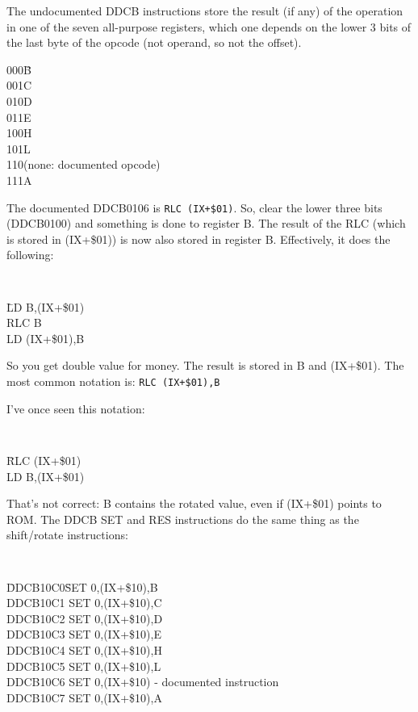 \documentclass[twoside,openright,a4paper]{book}
\begin{document}
The undocumented DDCB instructions store the result (if any) of the operation in one of the seven all-purpose registers, which one depends on the lower 3 bits of the last byte of the opcode (not operand, so not the offset).

\begin{tabbing}
	{\qquad}000\quad\=B\\
	{\qquad}001\>C\\
	{\qquad}010\>D\\
	{\qquad}011\>E\\
	{\qquad}100\>H\\
	{\qquad}101\>L\\
	{\qquad}110\>(none: documented opcode)\\
	{\qquad}111\>A
\end{tabbing}

The documented DDCB0106 is {\tt RLC (IX+\$01)}. So, clear the lower three bits (DDCB0100) and something is done to register B. The result of the RLC (which is stored in (IX+\$01)) is now also stored in register B. Effectively, it does the following:

{\tt 
	\begin{tabbing}
		{\qquad}\=LD B,(IX+\$01)\+\\
		RLC B\\
		LD (IX+\$01),B
	\end{tabbing}
}

So you get double value for money. The result is stored in B and (IX+\$01). The most common notation is: {\tt RLC (IX+\$01),B}

I've once seen this notation:
 
{\tt 
	\begin{tabbing}
		{\qquad}\=RLC (IX+\$01)\+\\
		LD B,(IX+\$01)
	\end{tabbing}
}

That's not correct: B contains the rotated value, even if (IX+\$01) points to ROM. The DDCB SET and RES instructions do the same thing as the shift/rotate instructions:

{\tt 
	\begin{tabbing}
		{\qquad}\=DDCB10C0{\qquad}\=SET 0,(IX+\$10),B\+\\
		DDCB10C1	\>SET 0,(IX+\$10),C\\
		DDCB10C2	\>SET 0,(IX+\$10),D\\
		DDCB10C3	\>SET 0,(IX+\$10),E\\
		DDCB10C4	\>SET 0,(IX+\$10),H\\
		DDCB10C5	\>SET 0,(IX+\$10),L\\
		DDCB10C6	\>SET 0,(IX+\$10) {\rm - documented instruction}\\
		DDCB10C7	\>SET 0,(IX+\$10),A
	\end{tabbing}
}
\end{document}
